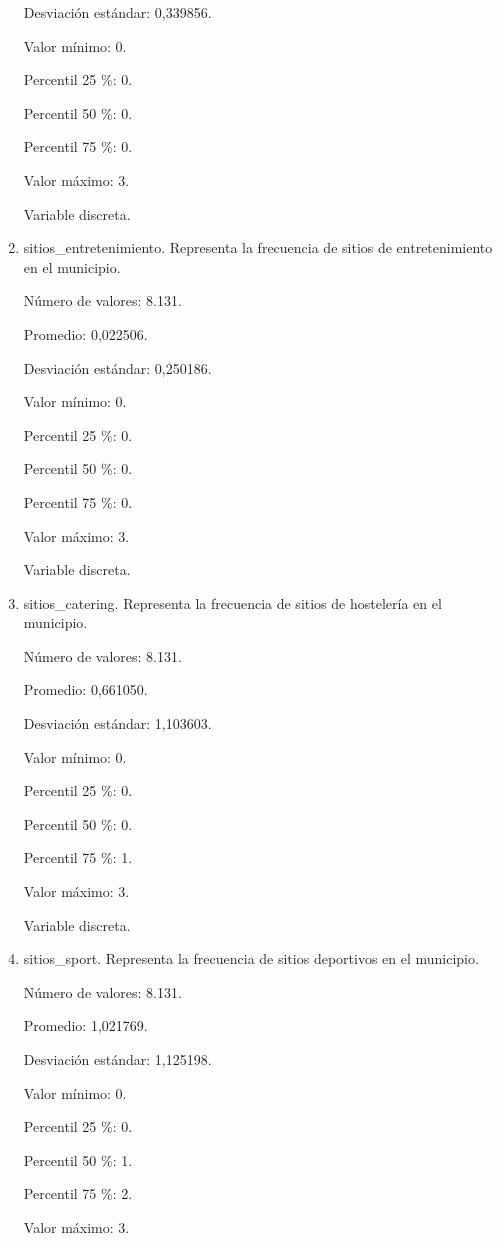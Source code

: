 \begin{enumerate}
	Desviación estándar: 0,339856.
	
	Valor mínimo: 0.
	
	Percentil 25 \%: 0.
	
	Percentil 50 \%: 0.
	
	Percentil 75 \%: 0.
	
	Valor máximo: 3.
	
	Variable discreta.

	\item sitios\_entretenimiento. Representa la frecuencia de sitios de entretenimiento en el municipio.
	
	Número de valores: 8.131.
	
	Promedio: 0,022506.
	
	Desviación estándar: 0,250186.
	
	Valor mínimo: 0.
	
	Percentil 25 \%: 0.
	
	Percentil 50 \%: 0.
	
	Percentil 75 \%: 0.
	
	Valor máximo: 3.
	
	Variable discreta.

	\item sitios\_catering. Representa la frecuencia de sitios de hostelería en el municipio.
	
	Número de valores: 8.131.
	
	Promedio: 0,661050.
	
	Desviación estándar: 1,103603.
	
	Valor mínimo: 0.
	
	Percentil 25 \%: 0.
	
	Percentil 50 \%: 0.
	
	Percentil 75 \%: 1.
	
	Valor máximo: 3.
	
	Variable discreta.

	\item sitios\_sport. Representa la frecuencia de sitios deportivos en el municipio.
	
	Número de valores: 8.131.
	
	Promedio: 1,021769.
	
	Desviación estándar: 1,125198.
	
	Valor mínimo: 0.
	
	Percentil 25 \%: 0.
	
	Percentil 50 \%: 1.
	
	Percentil 75 \%: 2.
	
	Valor máximo: 3.
	

\end{enumerate}
